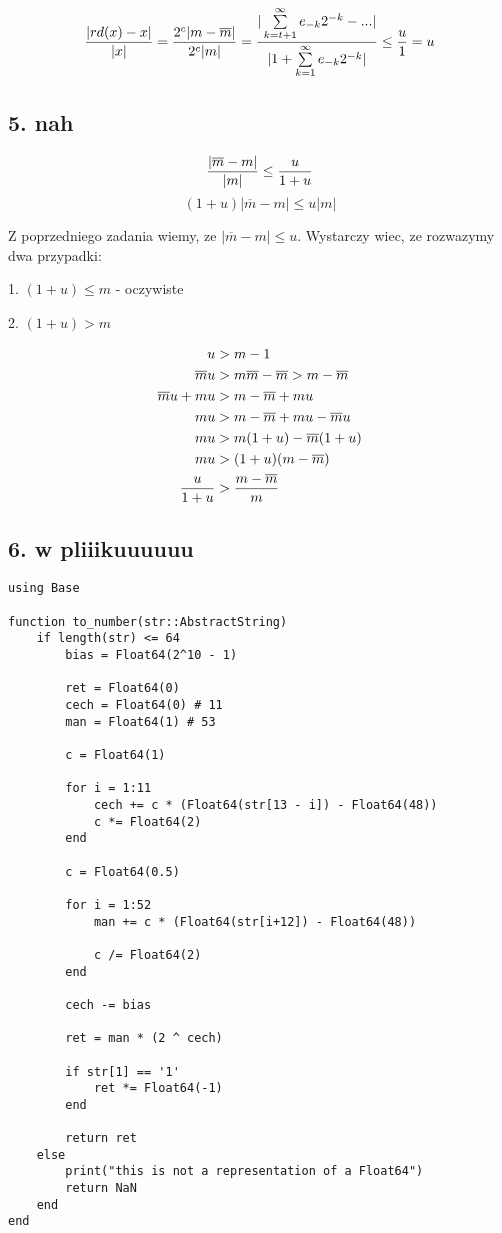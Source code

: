 \documentclass{article}[13pt]
\begin{document}
    \begin{align*}
        {|rd(x)-x|\over |x|} = {2^c|m-\overline m|\over 2^c |m|}= {|\sum\limits_{k=t+1}^\infty e_{-k}2^{-k}-...|\over |1+\sum\limits_{k=1}^\infty e_{-k}2^{-k}|}\leq \frac u 1 = u
    \end{align*}

    \subsection*{5. nah}

    $${|\overline m - m|\over |m|}\leq \frac u{1+u}$$
    $$(1+u)|\overline m - m|\leq u|m|$$

    Z poprzedniego zadania wiemy, ze $|\overline m-m|\leq u$. Wystarczy wiec, ze rozwazymy dwa przypadki:

    1. $(1+u)\leq m$ - oczywiste

    2. $(1+u) > m$

    \begin{align*}
        u &> m - 1\\
        \overline mu &> m\overline m - \overline m  >  m  -  \overline m \\
        \overline m u +  m u&> m  -  \overline m  +  m u\\
        m u &>  m - \overline m  +  m u -  \overline m u\\
        m u &>  m (1+u) -  \overline m (1+u)\\
        m u&>(1+u)( m - \overline m )\\
        {u\over 1+u} &> { m - \overline m \over  m }
    \end{align*}

    \subsection*{6. w pliiikuuuuuu}

\begin{lstlisting}
using Base

function to_number(str::AbstractString)
    if length(str) <= 64
        bias = Float64(2^10 - 1)

        ret = Float64(0)
        cech = Float64(0) # 11
        man = Float64(1) # 53

        c = Float64(1)

        for i = 1:11
            cech += c * (Float64(str[13 - i]) - Float64(48))
            c *= Float64(2)
        end

        c = Float64(0.5)

        for i = 1:52
            man += c * (Float64(str[i+12]) - Float64(48))

            c /= Float64(2)
        end

        cech -= bias

        ret = man * (2 ^ cech)

        if str[1] == '1'
            ret *= Float64(-1)
        end

        return ret
    else
        print("this is not a representation of a Float64")
        return NaN
    end
end
\end{lstlisting}
\end{document}

